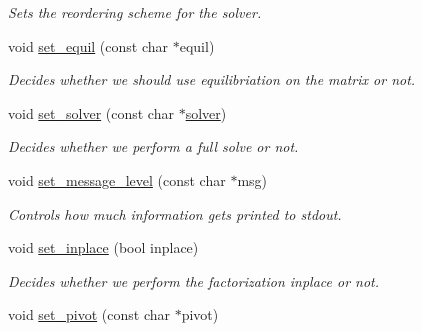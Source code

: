 \begin{DoxyCompactItemize}
\begin{DoxyCompactList}\small\item\em Sets the reordering scheme for the solver. \end{DoxyCompactList}\item 
void \hyperlink{classsymildl_1_1solver_a8442f13b529302ec5b0a1f89ca3f4bac}{set\+\_\+equil} (const char $\ast$equil)\hypertarget{classsymildl_1_1solver_a8442f13b529302ec5b0a1f89ca3f4bac}{}\label{classsymildl_1_1solver_a8442f13b529302ec5b0a1f89ca3f4bac}

\begin{DoxyCompactList}\small\item\em Decides whether we should use equilibriation on the matrix or not. \end{DoxyCompactList}\item 
void \hyperlink{classsymildl_1_1solver_aacf11e723c07200f443bf58b84196090}{set\+\_\+solver} (const char $\ast$\hyperlink{classsymildl_1_1solver}{solver})\hypertarget{classsymildl_1_1solver_aacf11e723c07200f443bf58b84196090}{}\label{classsymildl_1_1solver_aacf11e723c07200f443bf58b84196090}

\begin{DoxyCompactList}\small\item\em Decides whether we perform a full solve or not. \end{DoxyCompactList}\item 
void \hyperlink{classsymildl_1_1solver_a9889b8ade973adec0f0586fde9cab3a9}{set\+\_\+message\+\_\+level} (const char $\ast$msg)\hypertarget{classsymildl_1_1solver_a9889b8ade973adec0f0586fde9cab3a9}{}\label{classsymildl_1_1solver_a9889b8ade973adec0f0586fde9cab3a9}

\begin{DoxyCompactList}\small\item\em Controls how much information gets printed to stdout. \end{DoxyCompactList}\item 
void \hyperlink{classsymildl_1_1solver_a951cd55ae1abcb1e8284bd1a12dfa815}{set\+\_\+inplace} (bool inplace)\hypertarget{classsymildl_1_1solver_a951cd55ae1abcb1e8284bd1a12dfa815}{}\label{classsymildl_1_1solver_a951cd55ae1abcb1e8284bd1a12dfa815}

\begin{DoxyCompactList}\small\item\em Decides whether we perform the factorization inplace or not. \end{DoxyCompactList}\item 
void \hyperlink{classsymildl_1_1solver_a060c03d9f9ce73a3cdc37a6a54cb64e4}{set\+\_\+pivot} (const char $\ast$pivot)\hypertarget{classsymildl_1_1solver_a060c03d9f9ce73a3cdc37a6a54cb64e4}{}\label{classsymildl_1_1solver_a060c03d9f9ce73a3cdc37a6a54cb64e4}


\end{DoxyCompactItemize}
